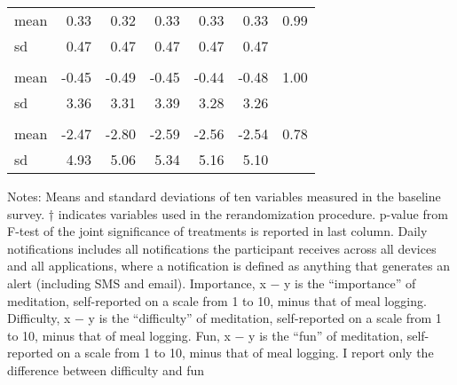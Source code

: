 \begin{longtable}{lrrrrrr}
\midrule\addlinespace[2.5pt]
\multicolumn{7}{l}{Logged meals, last month} \\[2.5pt] 
\midrule\addlinespace[2.5pt]
mean & 0.33 & 0.32 & 0.33 & 0.33 & 0.33 & 0.99 \\ 
sd & 0.47 & 0.47 & 0.47 & 0.47 & 0.47 &  \\ 
\midrule\addlinespace[2.5pt]
\multicolumn{7}{l}{Importance, x-y} \\[2.5pt] 
\midrule\addlinespace[2.5pt]
mean & -0.45 & -0.49 & -0.45 & -0.44 & -0.48 & 1.00 \\ 
sd & 3.36 & 3.31 & 3.39 & 3.28 & 3.26 &  \\ 
\midrule\addlinespace[2.5pt]
\multicolumn{7}{l}{Difficulty - fun, x-y} \\[2.5pt] 
\midrule\addlinespace[2.5pt]
mean & -2.47 & -2.80 & -2.59 & -2.56 & -2.54 & 0.78 \\ 
sd & 4.93 & 5.06 & 5.34 & 5.16 & 5.10 &  \\ 
\bottomrule
\end{longtable}
\begin{minipage}{\linewidth}

                    Notes: Means and standard deviations of ten variables measured in the baseline survey. † indicates variables used in the rerandomization procedure. p-value from F-test of the joint significance of treatments is reported in last column. Daily notifications includes all notifications the participant receives across all devices and all applications, where a notification is defined as anything that generates an alert (including SMS and email). Importance, x − y is the “importance” of meditation, self-reported on a scale from 1 to 10, minus that of meal logging. Difficulty, x − y is the “difficulty” of meditation, self-reported on a scale from 1 to 10, minus that of meal logging. Fun, x − y is the “fun” of meditation, self-reported on a scale from 1 to 10, minus that of meal logging. I report only the difference between difficulty and fun
                     \\
\end{minipage}
\endgroup

